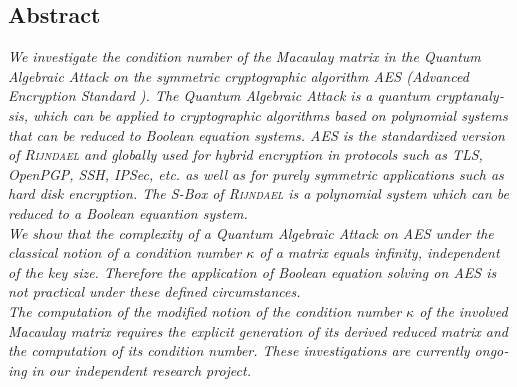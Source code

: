 \documentclass[a4paper,11pt]{article}
\begin{document}
\begin{otherlanguage}{english}

\vspace{3mm}



\section{Abstract}

\noindent
\textit{We investigate the condition number of the Macaulay matrix in the Quantum Algebraic Attack \cite{QAA} on the symmetric cryptographic algorithm \textsc{AES} (Advanced Encryption Standard \cite{AES}). The Quantum Algebraic Attack is a quantum cryptanalysis, which can be applied to cryptographic algorithms based on polynomial systems that can be reduced to Boolean equation systems. \textsc{AES} is the standardized version of \textsc{Rijndael} and globally used for hybrid encryption in protocols such as TLS, OpenPGP, SSH, IPSec, etc. as well as for purely symmetric applications such as hard disk encryption. The S-Box of \textsc{Rijndael} is a polynomial system which can be reduced to a Boolean equantion system.} \\

\noindent
\textit{We show that the complexity of a Quantum Algebraic Attack on \textsc{AES} under the classical notion of a condition number $\kappa$ of a matrix equals infinity, independent of the key size. Therefore the application of Boolean equation solving \cite{QAA} on \textsc{AES} is not practical under these defined circumstances. } \\

\noindent
\textit{The computation of the modified notion of the condition number $\kappa$ of the involved Macaulay matrix requires the explicit generation of its derived reduced matrix and the computation of its condition number. These investigations are currently ongoing in our independent research project. } \\



\end{otherlanguage}
\end{document}
